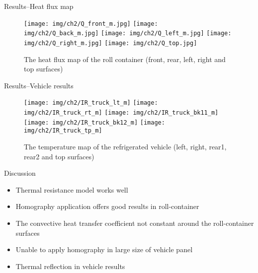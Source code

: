 \begin{frame}{Results--\small{Heat flux map}}
    \begin{figure}
        \vspace*{-5pt}
        \centering
        \texttt{[image: img/ch2/Q\_front\_m.jpg]}
        \hspace{5pt}
        \texttt{[image: img/ch2/Q\_back\_m.jpg]}
        \hspace*{5pt}
        \texttt{[image: img/ch2/Q\_left\_m.jpg]}
        \hspace{5pt}
        \texttt{[image: img/ch2/Q\_right\_m.jpg]}
        \texttt{[image: img/ch2/Q\_top.jpg]}
        \vspace*{-5pt}
        \caption{\footnotesize{The heat flux map of the roll container (front, rear, left, right and top surfaces)}}
    \end{figure}
\end{frame}


\begin{frame}{Results--\small{Vehicle results}}
    \begin{figure}
        \vspace*{-5pt}
        \centering
        \texttt{[image: img/ch2/IR\_truck\_lt\_m]}
        \hspace{3pt}
        \texttt{[image: img/ch2/IR\_truck\_rt\_m]}
        \texttt{[image: img/ch2/IR\_truck\_bk11\_m]}
        \hspace{6pt}
        \texttt{[image: img/ch2/IR\_truck\_bk12\_m]}
        \texttt{[image: img/ch2/IR\_truck\_tp\_m]}
        \vspace*{-5pt}
        \caption{\footnotesize{The temperature map of the refrigerated vehicle (left, right, rear1, rear2 and top surfaces)}}
    \end{figure}
\end{frame}


\begin{frame}{Discussion}
    \begin{itemize}[<+->]
    \pause
    \large
        \item Thermal resistance model works well
        \item Homography application offers good results in roll-container
        \item The convective heat transfer coefficient not constant around the roll-container surfaces
        \item Unable to apply homography in large size of vehicle panel 
        \item Thermal reflection in vehicle results
    \end{itemize}
\end{frame}
